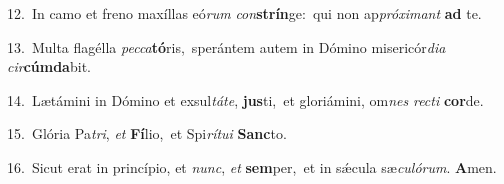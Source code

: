 {\numbfont\textcolor{\numbcolor}{12.}}~In camo et freno maxíllas eó\textit{rum} \textit{con}\-\textbf{strín}ge:~\star qui non ap\-\textit{pró}\-\textit{xi}\textit{mant} \textbf{ad} te.\par
{\numbfont\textcolor{\numbcolor}{13.}}~Multa flagélla \textit{pec}\-\textit{ca}\textbf{tó}ris,~\star sperántem autem in Dómino misericór\-\textit{di}\-\textit{a} \textit{cir}\-\textbf{cúm}\textbf{da}bit.\par
{\numbfont\textcolor{\numbcolor}{14.}}~Lætámini in Dómino et exsul\-\textit{tá}\-\textit{te}, \textbf{jus}\-ti,~\star et gloriámini, om\textit{nes} \textit{rec}\-\textit{ti} \textbf{cor}\-de.\par
{\numbfont\textcolor{\numbcolor}{15.}}~Glória Pa\-\textit{tri}\-, \textit{et} \textbf{Fí}\-lio,~\star et Spi\-\textit{rí}\-\textit{tu}\textit{i} \textbf{Sanc}\-to.\par
{\numbfont\textcolor{\numbcolor}{16.}}~Sicut erat in princípio, et \textit{nunc}\-, \textit{et} \textbf{sem}\-per,~\star et in sǽcula sæ\-\textit{cu}\-\textit{ló}\textit{rum}. \textbf{A}\-men.\par
